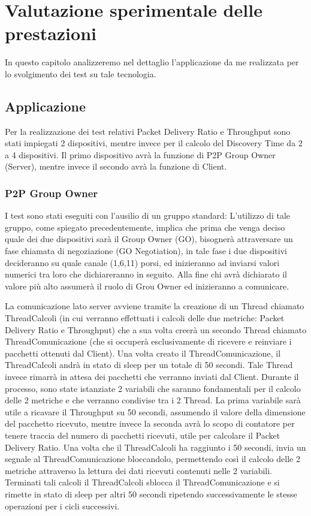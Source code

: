 \chapter{Valutazione sperimentale delle prestazioni}
In questo capitolo analizzeremo nel dettaglio l'applicazione da me realizzata per lo svolgimento dei test su tale tecnologia.

\section{Applicazione}
Per la realizzazione dei test relativi Packet Delivery Ratio e Throughput sono stati impiegati 2 dispositivi, mentre invece per il calcolo del Discovery Time da 2 a 4 dispositivi.
Il primo dispositivo avrà la funzione di P2P Group Owner (Server), mentre invece il secondo avrà la funzione di Client.

\subsection{P2P Group Owner}
I test sono stati eseguiti con l'ausilio di un gruppo standard:
L'utilizzo di tale gruppo, come spiegato precedentemente, implica che prima che venga deciso quale dei due dispositivi sarà il Group Owner (GO), bisognerà attraversare un fase chiamata di negoziazione (GO Negotiation), in tale fase i due dispositivi decideranno su quale canale (1,6,11) porsi, ed inizieranno ad inviarsi valori numerici tra loro che dichiareranno in seguito.
Alla fine chi avrà dichiarato il valore più alto assumerà il ruolo di Grou Owner ed inizieranno a comunicare.

La comunicazione lato server avviene tramite la creazione di un Thread chiamato ThreadCalcoli (in cui verranno effettuati i calcoli delle due metriche: Packet Delivery Ratio e Throughput) che a sua volta creerà un secondo Thread chiamato ThreadComunicazione (che si occuperà esclusivamente di ricevere e reinviare i pacchetti ottenuti dal Client).
Una volta creato il ThreadComunicazione, il ThreadCalcoli andrà in stato di sleep per un totale di 50 secondi.
Tale Thread invece rimarrà in attesa dei pacchetti che verranno inviati dal Client.
Durante il processo, sono state istanziate 2 variabili che saranno fondamentali per il calcolo delle 2 metriche e che verranno condivise tra i 2 Thread.
La prima variabile sarà utile a ricavare il Throughput su 50 secondi, assumendo il valore della dimensione del pacchetto ricevuto, mentre invece la seconda avrà lo scopo di contatore per tenere traccia del numero di pacchetti ricevuti, utile per calcolare il Packet Delivery Ratio.
Una volta che il ThreadCalcoli ha raggiunto i 50 secondi, invia un segnale al ThreadComunicazione bloccandolo, permettendo così il calcolo delle 2 metriche attraverso la lettura dei dati ricevuti contenuti nelle 2 variabili.
Terminati tali calcoli il ThreadCalcoli sblocca il ThreadComunicazione e si rimette in stato di sleep per altri 50 secondi ripetendo successivamente le stesse operazioni per i cicli successivi.

